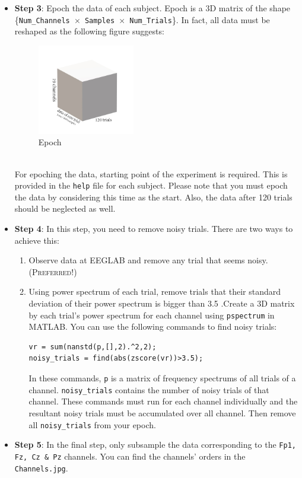 \documentclass[12pt]{article}
\begin{document}
\begin{itemize}
	\item \textbf{Step 3}:  Epoch the data of each subject. Epoch is a 3D matrix of the shape \{\texttt{Num\_Channels $\times$ Samples $\times$ Num\_Trials}\}. In fact, all data must be reshaped as the following figure suggests:
	      \begin{figure}[h]
		      \center \includegraphics[scale=1,width=0.4\textwidth]{Images/epoch.jpg}
		      \caption{Epoch}
		      \label{fig:fig5}
	      \end{figure}\\
	      For epoching the data, starting point of the experiment is required. This is provided in the \texttt{help} file for each subject. Please note that you must epoch the data by considering this time as the start. Also, the data after 120 trials should be neglected as well.

	\item \textbf{Step 4}: In this step, you need to remove noisy trials. There are two ways to achieve this:
	      \begin{enumerate}
		      \item Observe data at EEGLAB and remove any trial that seems noisy. (\textsc{Preferred!})
		      \item Using power spectrum of each trial, remove trials that their standard deviation of their power spectrum is bigger than 3.5 .Create a 3D matrix by each trial's power spectrum for each channel using \texttt{pspectrum} in MATLAB. You can use the following commands to find noisy trials:
		            \begin{lstlisting}[style=Matlab-editor]
vr = sum(nanstd(p,[],2).^2,2);
noisy_trials = find(abs(zscore(vr))>3.5);
        \end{lstlisting}

		            In these commands, \texttt{p} is a matrix of frequency spectrums of all trials of a channel. \texttt{noisy\_trials} contains the number of noisy trials of that channel. These commands must run for each channel individually and the resultant noisy trials must be accumulated over all channel. Then remove all \texttt{noisy\_trials} from your epoch.
	      \end{enumerate}

	\item \textbf{Step 5}: In the final step, only subsample the data corresponding to the \texttt{Fp1, Fz, Cz \& Pz} channels. You can find the channels' orders in the \texttt{Channels.jpg}.
\end{itemize}
\end{document}
